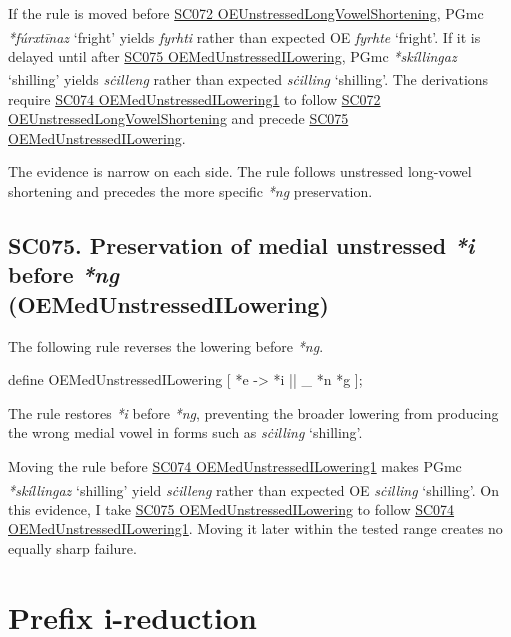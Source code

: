 \documentclass[
  british,
  a4paper,
  openany]{book}
\providecommand{\Pred}[1]{\textsuperscript{\dag}\emph{#1}}
\providecommand{\Recon}[1]{\emph{*#1}}
{\catcode`→=\active \global\def→{\ensuremath{\rightarrow}}}
\providecommand{\texorpdfstring}[2]{#1}
\DeclareRobustCommand{\CAPRRuleHeading}[2]{%
  #1\texorpdfstring{\\(#2)}{ (#2)}%
}
\providecommand{\Pred}[1]{\textsuperscript{\dag}\emph{#1}}
\providecommand{\Recon}[1]{\emph{*#1}}
{\catcode`→=\active \global\def→{\ensuremath{\rightarrow}}}
\begin{document}
If the rule is moved before
\hyperref[rule-OEUnstressedLongVowelShortening]{SC072
OEUnstressedLongVowelShortening}, PGmc \Recon{fúrxtīnaz} `fright' yields
\Pred{fyrhti} rather than expected OE \emph{fyrhte} `fright'. If it is
delayed until after \hyperref[rule-OEMedUnstressedILowering]{SC075
OEMedUnstressedILowering}, PGmc \Recon{skíllingaz} `shilling' yields
\Pred{sċilleng} rather than expected \emph{sċilling} `shilling'. The
derivations require \hyperref[rule-OEMedUnstressedILowering1]{SC074
OEMedUnstressedILowering1} to follow
\hyperref[rule-OEUnstressedLongVowelShortening]{SC072
OEUnstressedLongVowelShortening} and precede
\hyperref[rule-OEMedUnstressedILowering]{SC075
OEMedUnstressedILowering}.

The evidence is narrow on each side. The rule follows unstressed
long-vowel shortening and precedes the more specific \emph{*ng}
preservation.

\subsection{\texorpdfstring{\CAPRRuleHeading{SC075. Preservation of medial unstressed \emph{*i} before \emph{*ng}}{OEMedUnstressedILowering}}{}}\label{rule-OEMedUnstressedILowering}

The following rule reverses the lowering before \emph{*ng}.

\begin{ReaderFacingFoma}
define OEMedUnstressedILowering [
    {*e} -> {*i} || _ {*n} {*g}
];
\end{ReaderFacingFoma}

The rule restores \emph{*i} before \emph{*ng}, preventing the broader
lowering from producing the wrong medial vowel in forms such as
\emph{sċilling} `shilling'.

Moving the rule before \hyperref[rule-OEMedUnstressedILowering1]{SC074
OEMedUnstressedILowering1} makes PGmc \Recon{skíllingaz} `shilling'
yield \Pred{sċilleng} rather than expected OE \emph{sċilling}
`shilling'. On this evidence, I take
\hyperref[rule-OEMedUnstressedILowering]{SC075 OEMedUnstressedILowering}
to follow \hyperref[rule-OEMedUnstressedILowering1]{SC074
OEMedUnstressedILowering1}. Moving it later within the tested range
creates no equally sharp failure.

\newpage

\section{Prefix i-reduction}\label{prefix-i-reduction}
\end{document}
